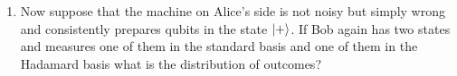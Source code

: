 \documentclass[12pt]{article}
\begin{document}
\begin{enumerate}
\begin{enumerate}
\item Now suppose that the machine on Alice's side is not noisy but simply wrong and consistently prepares qubits in the state $\ket{+}$. If Bob again has two states and measures one of them in the standard basis and one of them in the Hadamard basis what is the distribution of  outcomes?
\end{enumerate}



\end{enumerate}
\end{document}
